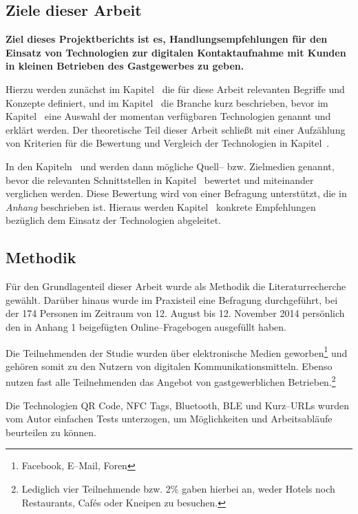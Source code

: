 \subsection{Ziele dieser Arbeit} %
\label{sub:ziele}
\textbf{Ziel dieses Projektberichts ist es, Handlungsempfehlungen für den Einsatz von Technologien zur digitalen Kontaktaufnahme mit Kunden in kleinen Betrieben des Gastgewerbes zu geben.}

Hierzu werden zunächst im Kapitel~ die für diese Arbeit relevanten Begriffe und Konzepte definiert, und im Kapitel~ die Branche kurz beschrieben, bevor im Kapitel~ eine Auswahl der momentan verfügbaren Technologien genannt und erklärt werden.
Der theoretische Teil dieser Arbeit schließt mit einer Aufzählung von Kriterien für die Bewertung und Vergleich der Technologien in Kapitel~.

In den Kapiteln~ und  werden dann mögliche Quell– bzw. Zielmedien genannt, bevor  die relevanten Schnittstellen in Kapitel~ bewertet und miteinander verglichen werden. Diese Bewertung wird von einer Befragung unterstützt, die in \textit{Anhang} beschrieben ist. Hieraus werden Kapitel~ konkrete Empfehlungen bezüglich dem Einsatz der Technologien abgeleitet.

\subsection{Methodik} %
\label{sub:methodik}
Für den Grundlagenteil dieser Arbeit wurde als Methodik die Literaturrecherche gewählt. Darüber hinaus wurde im Praxisteil eine Befragung durchgeführt, bei der 174 Personen im Zeitraum von 12. August bis 12. November 2014 persönlich den in Anhang 1 beigefügten Online–Fragebogen ausgefüllt haben. 

Die Teilnehmenden der Studie wurden über elektronische Medien geworben\footnote{Facebook, E–Mail, Foren} und gehören somit zu den Nutzern von digitalen Kommunikationsmitteln. Ebenso nutzen fast alle Teilnehmenden das Angebot von gastgewerblichen Betrieben.\footnote{Lediglich vier Teilnehmende bzw. 2\% gaben hierbei an, weder Hotels noch Restaurants, Cafés oder Kneipen zu besuchen.}

Die Technologien \ac{QR Code}, \ac{NFC} Tags, Bluetooth, \ac{BLE} und Kurz–URLs wurden vom Autor einfachen Tests unterzogen, um Möglichkeiten und Arbeitsabläufe beurteilen zu können.

